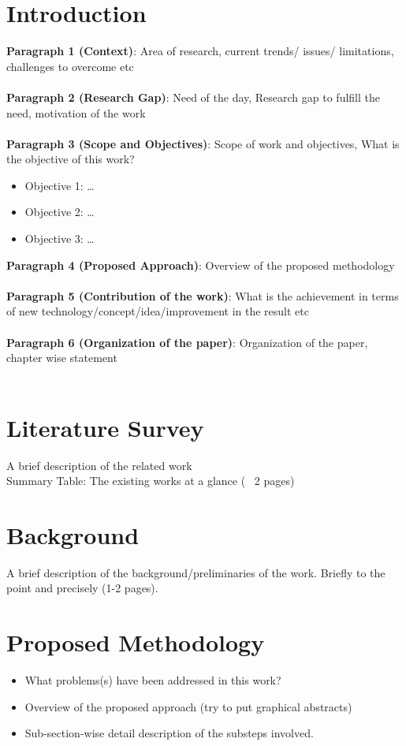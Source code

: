 \documentclass{article}
\begin{document}
\LARGE\section{Introduction}
\large\textbf{{Paragraph 1 (Context)}}: Area of research, current trends/ issues/ limitations, challenges to overcome etc \\\\
\large\textbf{{Paragraph 2 (Research Gap)}}: Need of the day, Research gap to fulfill the need, motivation of the work \\\\
\large\textbf{{Paragraph 3 (Scope and Objectives)}}: Scope of work and objectives, What is the objective of this work?
\begin{itemize}
    \item Objective 1: \ldots
    \item Objective 2: \ldots
    \item Objective 3: \ldots
\end{itemize}
\large\textbf{{Paragraph 4 (Proposed Approach)}}: Overview of the proposed methodology \\\\
\large\textbf{{Paragraph 5 (Contribution of the work)}}: What is the achievement in terms of new technology/concept/idea/improvement in the result etc\\\\
\large\textbf{{Paragraph 6 (Organization of the paper)}}: Organization of the paper, chapter wise statement \\\\

\hline
\section{Literature Survey}
A brief description of the related work\\
Summary Table: The existing works at a glance (~ 2 pages)\\
\hline

\section{Background}
A brief description of the background/preliminaries of the work. Briefly to the point and precisely (1-2 pages).\\
\hline

\section{Proposed Methodology}
\begin{itemize}
    \item What problems(s) have been addressed in this work?
    \item Overview of the proposed approach (try to put graphical abstracts)
    \item  Sub-section-wise detail description of the substeps involved.
\end{itemize}
\end{document}
